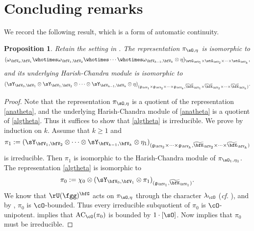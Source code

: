 \documentclass[12pt,a4paper]{amsart}
\newcommand{\AC}{\mathrm{AC}}
\newcommand{\g}{\mathfrak g}
\numberwithin{equation}{section}
\newtheorem{prop}[thm]{Proposition}
\theoremstyle{remark}
\def\wtbfK{\widetilde{\bfK}}
\begin{document}
\section{Concluding remarks}
We record the following result, which is a form of automatic continuity.

\begin{prop}Retain the setting in .
  The representation $ \pi_{\sO, \eta}$ is isomorphic to
  \begin{equation}\label{anatheta}
    (\omega_{\bfV_0, \bfV_1}\whotimes \omega_{\bfV_1, \bfV_2} \whotimes \cdots
    \whotimes \omega_{\bfV_{k-1},\bfV_k}\otimes \eta)_{
      \wtG_{\bfV_1}\times \wtG_{\bfV_2}\times \cdots \times  \wtG_{\bfV_k}},
  \end{equation}
  and its underlying Harish-Chandra module is isomorphic to
  \begin{equation}\label{algtheta}
    (\sY_{\bfV_0, \bfV_1} \otimes \sY_{\bfV_1, \bfV_2} \otimes \cdots
    \otimes \sY_{\bfV_{k-1},\bfV_k}\otimes \eta )_{
      (\g_{\bfV_1}\times \g_{\bfV_2}\times \cdots \times \g_{\bfV_k},
      \wtbfK_{\bfV_1}\times  \wtbfK_{\bfV_2}\times \cdots \times \wtbfK_{\bfV_k})}.
  \end{equation}
\end{prop}
\begin{proof}
  Note that the representation $ \pi_{\sO, \eta}$ is a quotient of the
  representation \eqref{anatheta}, and the underlying Harish-Chandra module of
  \eqref{anatheta} is a quotient of \eqref{algtheta}. Thus it suffices to show
  that \eqref{algtheta} is irreducible.  We prove by induction on $k$. Assume that $k\geq 1$ and
  \[
    \pi_1:= (\sY_{\bfV_1, \bfV_2} \otimes \cdots \otimes
    \sY_{\bfV_{k-1},\bfV_k}\otimes \eta_1)_{(\g_{\bfV_2}\times
      \cdots \times \g_{\bfV_k}, \widetilde{\bfK}_{\bfV_2}\times \cdots \times \widetilde{\bfK}_{\bfV_k})}
  \]
  is irreducible. Then $\pi_1$ is isomorphic to the Harish-Chandra module of
  $ \pi_{\sO_1, \eta_1}$.  The representation \eqref{algtheta} is isomorphic to
  \[
    \pi_0:= \chi_0 \otimes (\sY_{\bfV_0, \bfV_1} \otimes \pi_1)_{(\g_{\bfV_1},
      \widetilde{\bfK}_{\bfV_1})}.
  \]
  We know that  $\rU(\fgg)^{\bfG} $ acts on $\pi_{\sO, \eta}$ through the character $\lambda_{\cO}$ (\emph{cf}. \cite{PrzInf}), and by
  , $\pi_0$ is $\cO$-bounded.  Thus every irreducible
  subquotient of $\pi_0$ is $\cO$-unipotent.  
  implies that $\AC_{\cO}(\pi_0)$ is bounded by $1\cdot [\sO]$. Now
   implies that $\pi_0$ must be irreducible.
\end{proof}
\end{document}
